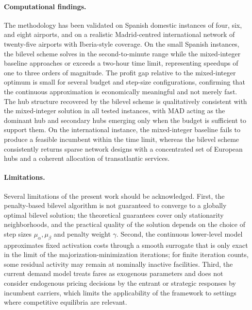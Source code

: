 \paragraph{Computational findings.}
The methodology has been validated on Spanish domestic instances of four, six, and eight airports, and on a realistic Madrid-centred international network of twenty-five airports with Iberia-style coverage. On the small Spanish instances, the bilevel scheme solves in the second-to-minute range while the mixed-integer baseline approaches or exceeds a two-hour time limit, representing speedups of one to three orders of magnitude. The profit gap relative to the mixed-integer optimum is small for several budget and step-size configurations, confirming that the continuous approximation is economically meaningful and not merely fast. The hub structure recovered by the bilevel scheme is qualitatively consistent with the mixed-integer solution in all tested instances, with MAD acting as the dominant hub and secondary hubs emerging only when the budget is sufficient to support them. On the international instance, the mixed-integer baseline fails to produce a feasible incumbent within the time limit, whereas the bilevel scheme consistently returns sparse network designs with a concentrated set of European hubs and a coherent allocation of transatlantic services.

\paragraph{Limitations.}
Several limitations of the present work should be acknowledged. First, the penalty-based bilevel algorithm is not guaranteed to converge to a globally optimal bilevel solution; the theoretical guarantees cover only stationarity neighborhoods, and the practical quality of the solution depends on the choice of step sizes $\mu_\alpha,\mu_\beta$ and penalty weight $\gamma$. Second, the continuous lower-level model approximates fixed activation costs through a smooth surrogate that is only exact in the limit of the majorization-minimization iterations; for finite iteration counts, some residual activity may remain at nominally inactive facilities. Third, the current demand model treats fares as exogenous parameters and does not consider endogenous pricing decisions by the entrant or strategic responses by incumbent carriers, which limits the applicability of the framework to settings where competitive equilibria are relevant.

